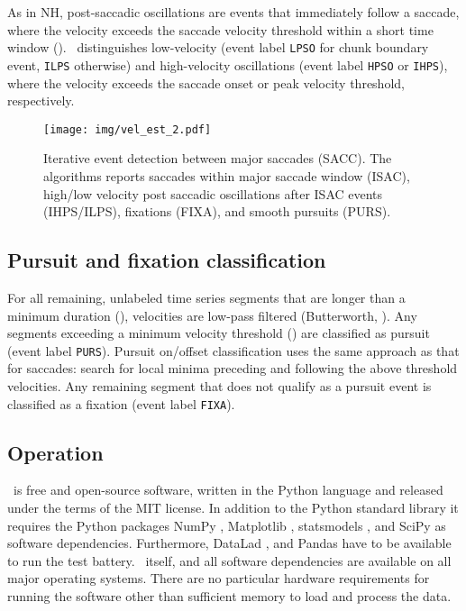 As in NH, post-saccadic oscillations are events that immediately follow a
saccade, where the velocity exceeds the saccade velocity threshold within a short
time window (). \remodnav\ distinguishes low-velocity
(event label \texttt{LPSO} for chunk boundary event, \texttt{ILPS} otherwise)
and high-velocity oscillations (event label \texttt{HPSO} or \texttt{IHPS}),
where the velocity exceeds the saccade onset or peak velocity threshold,
respectively.

\begin{figure}
  \texttt{[image: img/vel\_est\_2.pdf]}
  \caption{Iterative event detection between major saccades (SACC).
  The algorithms reports saccades within major saccade window (ISAC),
  high/low velocity post saccadic oscillations after ISAC events (IHPS/ILPS),
  fixations (FIXA), and smooth pursuits (PURS).}
  \label{fig:velest2}
\end{figure}

\subsection*{Pursuit and fixation classification}

For all remaining, unlabeled time series segments that are longer than a
minimum duration (), velocities are low-pass
filtered (Butterworth, ). Any segments
exceeding a minimum velocity threshold () are
classified as pursuit (event label \texttt{PURS}). Pursuit on/offset classification
uses the same approach as that for saccades: search for local minima preceding
and following the above threshold velocities.
%
Any remaining segment that does not qualify as a pursuit event is classified
as a fixation (event label \texttt{FIXA}).


\subsection*{Operation}\label{op}

\remodnav\ is free and open-source software, written in the Python language and
released under the terms of the MIT license. In addition to the Python standard
library it requires the Python packages
%
NumPy \citep{oliphant2006guide},
Matplotlib \citep{hunter2007matplotlib},
statsmodels \citep{seabold2010statsmodels},
and SciPy \citep{JOP+2001} as software dependencies.
Furthermore, DataLad \citep{HH+2013},
and Pandas \citep{mckinney2010data}
%
have to be available to run the test
battery. \remodnav\ itself, and all software dependencies are available on all
major operating systems.  There are no particular hardware requirements for
running the software other than sufficient memory to load and process the data.


